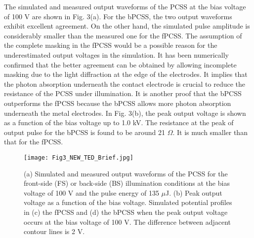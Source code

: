 \documentclass[final,5p,times,twocolumn]{elsarticle}
\begin{document}
   The simulated and measured output waveforms of the PCSS at the bias voltage of 100 V are shown in Fig. 3(a).
   For the bPCSS, the two output waveforms exhibit excellent agreement.
   On the other hand, the simulated pulse amplitude is considerably smaller than the measured one for the fPCSS.
   The assumption of the complete masking in the fPCSS would be a possible reason for the underestimated output voltages in the simulation.
   It has been numerically confirmed that the better agreement can be obtained by allowing incomplete masking due to the light diffraction at the edge of the electrodes.
   It implies that the photon absorption underneath the contact electrode is crucial to reduce the resistance of the PCSS under illumination.
   It is another proof that the bPCSS outperforms the fPCSS because the bPCSS allows more photon absorption underneath the metal electrodes.
   In Fig. 3(b), the peak output voltage is shown as a function of the bias  voltage up to 1.0 kV.
   The resistance at the peak of output pulse for the bPCSS is found to be around 21 $\Omega$.
   It is much smaller than that for the fPCSS.

\begin{figure}[!t]
\centering
\texttt{[image: Fig3\_NEW\_TED\_Brief.jpg]}
\caption{
(a) Simulated and measured output waveforms of the PCSS for the front-side (FS) or back-side (BS) illumination conditions at the bias voltage of 100 V and the pulse energy of 135 $\mu$J.
(b) Peak output voltage as a function of the bias voltage.
Simulated potential profiles in (c) the fPCSS and (d) the bPCSS when the peak output voltage occurs at the bias voltage of 100 V.
The difference between adjacent contour lines is 2 V. 
}
\label{fig_simulation}
\end{figure}   
\end{document}
